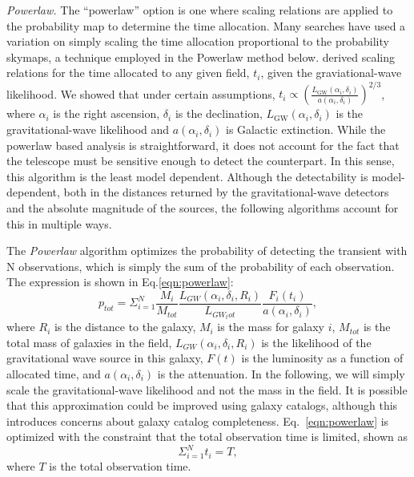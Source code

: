 \documentclass[twocolumn]{aastex62}
\begin{document}
\emph{Powerlaw.} The ``powerlaw'' option is one where scaling relations are applied to the probability map to determine the time allocation.
Many searches have used a variation on simply scaling the time allocation proportional to the probability skymaps, a technique employed in the Powerlaw method below. \cite{CoSt2016a} derived scaling relations for the time allocated to any given field, $t_i$, given the graviational-wave likelihood. We showed that under certain assumptions, $t_i \propto \left(\frac{L_\textrm{GW}(\alpha_i,\delta_i)}{a(\alpha_i,\delta_i)}\right)^{2/3}$, where $\alpha_i$ is the right ascension, $\delta_i$ is the declination, $L_\textrm{GW}(\alpha_i,\delta_i)$ is the gravitational-wave likelihood and $a(\alpha_i,\delta_i)$ is Galactic extinction.  While the powerlaw based analysis is straightforward, it does not account for the fact that the telescope must be sensitive enough to detect the counterpart. In this sense, this algorithm is the least model dependent. Although the detectability is model-dependent, both in the distances returned by the gravitational-wave detectors and the absolute magnitude of the sources, the following algorithms account for this in multiple ways.

The \emph{Powerlaw} algorithm optimizes the probability of detecting the transient with N observations, which is simply the sum of the probability of each observation. The expression is shown in Eq.\ref{eqn:powerlaw}:
\begin{equation}\label{eqn:powerlaw}
p_{tot}=\Sigma_{i=1}^N \frac{M_i}{M_{tot}}\frac{L_{GW}(\alpha_i, \delta_i, R_i)}{L_{GW_tot}}\frac{F_i(t_i)}{a(\alpha_i, \delta_i)},
\end{equation}
where $R_i$ is the distance to the galaxy, $M_i$ is the mass for galaxy $i$, $M_{tot}$ is the total mass of galaxies in the field, $L_{GW}(\alpha_i, \delta_i, R_i)$ is the likelihood of the gravitational wave source in this galaxy, $F(t)$ is the luminosity as a function of allocated time, and $a(\alpha_i, \delta_i)$ is the attenuation. In the following, we will simply scale the gravitational-wave likelihood and not the mass in the field. It is possible that this approximation could be improved using galaxy catalogs, although this introduces concerns about galaxy catalog completeness. Eq.~\ref{eqn:powerlaw} is optimized with the constraint that the total observation time is limited, shown as
\begin{equation}
\Sigma_{i=1}^N t_i=T,
\end{equation}
where $T$ is the total observation time.
\end{document}
